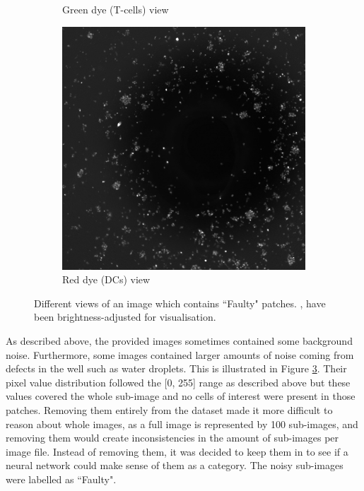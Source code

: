 \begin{figure}[h]
\begin{subfigure}[h!]{0.3\textwidth}
        \caption{Green dye (T-cells) view}
        \label{subfig:tcell}
    \end{subfigure}
    \begin{subfigure}[h!]{0.3\textwidth}
        \includegraphics[width=\textwidth]{dissertation/figures/faulty_dcell.jpg}
        \caption{Red dye (DCs) view}
        \label{subfig:dc}
    \end{subfigure}
    \caption{Different views of an image which contains ``Faulty" patches. \protect{}, \protect{} have been brightness-adjusted for visualisation.}
    \label{fig:noisyimage}
\end{figure}
As described above, the provided images sometimes contained some background noise. Furthermore, some images contained larger amounts of noise coming from defects in the well such as water droplets. This is illustrated in Figure \ref{fig:noisyimage}. Their pixel value distribution followed the [0, 255] range as described above but these values covered the whole sub-image and no cells of interest were present in those patches. Removing them entirely from the dataset made it more difficult to reason about whole images, as a full image is represented by 100 sub-images, and removing them would create inconsistencies in the amount of sub-images per image file. Instead of removing them, it was decided to keep them in to see if a neural network could make sense of them as a category. The noisy sub-images were labelled as ``Faulty".


